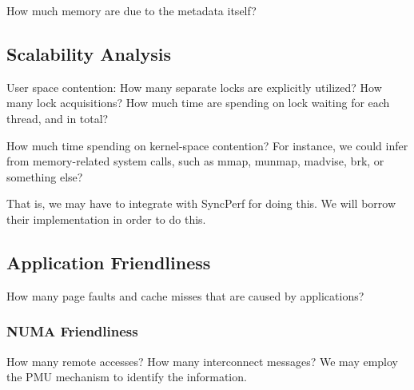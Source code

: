 How much memory are due to the metadata itself? 

\subsection{Scalability Analysis} 

User space contention:
How many separate locks are explicitly utilized? 
How many lock acquisitions? How much time are spending on lock waiting for each thread, and in total?

How much time spending on kernel-space contention? For instance, we could infer from memory-related system calls, such as mmap, munmap, madvise, brk, or something else? 

That is, we may have to integrate with SyncPerf for doing this. We will borrow their implementation in order to do this. 

\subsection{Application Friendliness} 
How many page faults and cache misses that are caused by applications? 

\subsubsection{NUMA Friendliness} 
How many remote accesses? How many interconnect messages? We may employ the PMU mechanism to identify the information.
